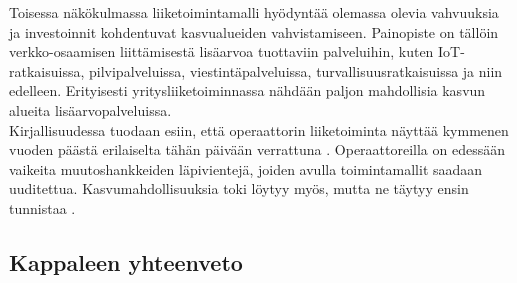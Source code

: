 \documentclass[finnish,12pt,a4paper,pdftex]{article}
\begin{document}
Toisessa näkökulmassa liiketoimintamalli hyödyntää olemassa olevia vahvuuksia ja investoinnit kohdentuvat kasvualueiden vahvistamiseen. Painopiste on tällöin verkko-osaamisen liittämisestä lisäarvoa tuottaviin palveluihin, kuten IoT-ratkaisuissa, pilvipalveluissa, viestintäpalveluissa, turvallisuusratkaisuissa ja niin edelleen. Erityisesti yritysliiketoiminnassa nähdään paljon mahdollisia kasvun alueita lisäarvopalveluissa. \citep{mckinseyope} \\

Kirjallisuudessa tuodaan esiin, että operaattorin liiketoiminta näyttää kymmenen vuoden päästä erilaiselta tähän päivään verrattuna \citep{mckinseytele, mckinseyope}. Operaattoreilla on edessään vaikeita muutoshankkeiden läpivientejä, joiden avulla toimintamallit saadaan uuditettua. Kasvumahdollisuuksia toki löytyy myös, mutta ne täytyy ensin tunnistaa \citep{mckinseyope}.\\












\subsection{Kappaleen yhteenveto}
\end{document}
